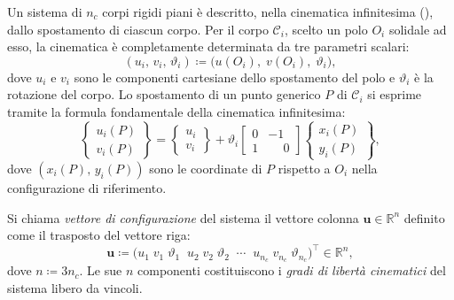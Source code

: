 Un sistema di $n_c$ corpi rigidi piani è descritto, nella
cinematica infinitesima (), dallo spostamento di
ciascun corpo. Per il corpo $\mathcal{C}_i$, scelto un polo $O_i$
solidale ad esso, la cinematica è completamente determinata da
tre parametri scalari:
\begin{equation}
	(u_i,\, v_i,\, \vartheta_i)
	\coloneqq
	\bigl(u(O_i),\; v(O_i),\; \vartheta_i\bigr),
\end{equation}
dove $u_i$ e $v_i$ sono le componenti cartesiane dello
spostamento del polo e $\vartheta_i$ è la rotazione del corpo.
Lo spostamento di un punto generico $P$ di $\mathcal{C}_i$ si
esprime tramite la formula fondamentale della cinematica
infinitesima:
\begin{equation}\label{eq:FFCI_i}
	\begin{Bmatrix} u_i(P) \\ v_i(P) \end{Bmatrix}
	=
	\begin{Bmatrix} u_i \\ v_i \end{Bmatrix}
	+ \vartheta_i
	\begin{bmatrix} 0 & -1 \\ 1 & \phantom{-}0 \end{bmatrix}
	\begin{Bmatrix} x_i(P) \\ y_i(P) \end{Bmatrix},
\end{equation}
dove $(x_i(P),\, y_i(P))$ sono le coordinate di $P$ rispetto a
$O_i$ nella configurazione di riferimento.

\begin{definizione}\label{def:vettore_conf}
	Si chiama \emph{vettore di configurazione} del sistema il
	vettore colonna $\bm{u} \in \mathbb{R}^{n}$ definito come il
	trasposto del vettore riga:
	\begin{equation}\label{eq:vettore_u}
		\bm{u} \coloneqq
		\bigl(
		u_1 \; v_1 \; \vartheta_1 \;\;
		u_2 \; v_2 \; \vartheta_2 \;\;
		\cdots \;\;
		u_{n_c} \; v_{n_c} \; \vartheta_{n_c}
		\bigr)^{\!\top}
		\in \mathbb{R}^{n},
	\end{equation}
	dove $n \coloneqq 3 n_c$. Le sue $n$ componenti costituiscono
	i \emph{gradi di libertà cinematici} del sistema libero da vincoli.
\end{definizione}

